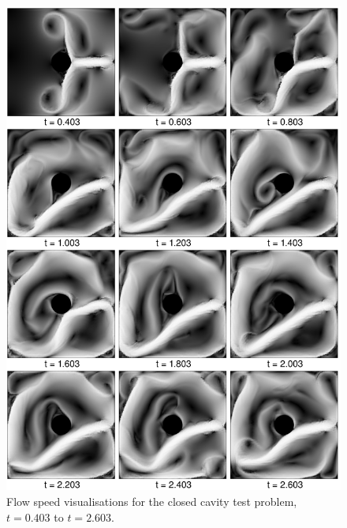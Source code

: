 \begin{figure}[htbp]
    \includegraphics[width=\textwidth]{figures/navier_stokes/navier_1.png}
    \caption{
        Flow speed visualisations for the closed cavity test problem, $t = 0.403$ to $t = 2.603$.
    }
    \label{navier_1}
\end{figure}


